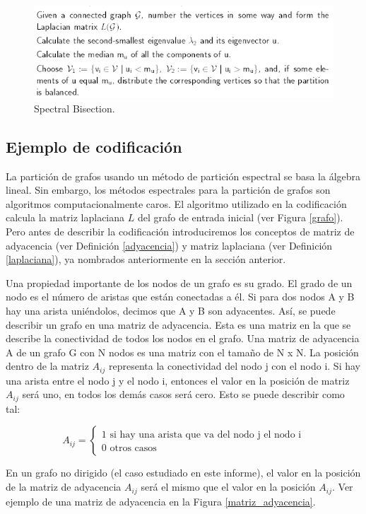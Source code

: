 \begin{figure}[h]
	\centering
	\includegraphics[scale=0.8]{Figures/bisection_pseudocode}
	\vspace{1mm}
	\caption{Spectral Bisection.}
	\label{bisection_pseudocode}
\end{figure}

\subsection{Ejemplo de codificación}

La partición de grafos usando un método de partición espectral se basa la álgebra lineal. Sin embargo, los métodos espectrales para la partición de grafos son algoritmos computacionalmente caros. El algoritmo utilizado en la codificación calcula la matriz laplaciana $L$ del grafo de entrada inicial (ver Figura \ref{grafo}). Pero antes de describir la codificación introduciremos los conceptos de matriz de adyacencia (ver Definición \ref{adyacencia}) y matriz laplaciana (ver Definición \ref{laplaciana}), ya nombrados anteriormente en la sección anterior.

\begin{mydef}\label{adyacencia}
	Una propiedad importante de los nodos de un grafo es su grado. El grado de un nodo es el número de aristas que están conectadas a él. Si para dos nodos A y B hay una arista uniéndolos, decimos que A y B son adyacentes. Así, se puede describir un grafo en una matriz de adyacencia. Esta es una matriz en la que se describe la conectividad de todos los nodos en el grafo. Una matriz de adyacencia A de un grafo G con N nodos es una matriz con el tamaño de N x N. La posición dentro de la matriz $A_{ij}$ representa la conectividad del nodo j con el nodo i. Si hay una arista entre el nodo j y el nodo i, entonces el valor en la posición de matriz $A_{ij}$ será uno, en todos los demás casos será cero. 
	\newpage
	Esto se puede describir como tal:
	\begin{center}
		$$
		A_{ij} = 
		\begin{cases}
			\text{1 si hay una arista que va del nodo j el nodo i} \\
			\text{0 otros casos}
		\end{cases}
		$$
	\end{center}
	En un grafo no dirigido (el caso estudiado en este informe), el valor en la posición de la matriz de adyacencia $A_{ij}$ será el mismo que el valor en la posición $A_{ij}$. Ver ejemplo de una matriz de adyacencia en la Figura \ref{matriz_adyacencia}.
\end{mydef}


